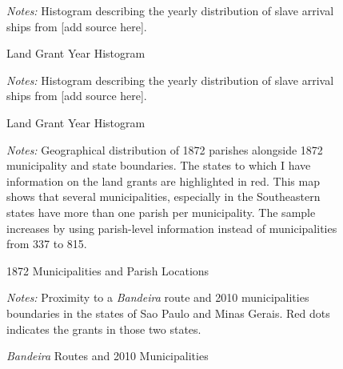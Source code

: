 \documentclass{article}
\begin{document}
\clearpage

\begin{figure}[h!]
  \caption{Land Grant Year Histogram}
  \begin{center}
  \end{center}
  \textit{Notes:} Histogram describing the yearly distribution of slave arrival ships from [add source here].  
  \label{fig:slave_distribution}
\end{figure}

\clearpage

\begin{figure}[h!]
  \caption{Land Grant Year Histogram}
  \begin{center}
  \end{center}
  \textit{Notes:} Histogram describing the yearly distribution of slave arrival ships from [add source here].  
  \label{fig:slave_distribution_region}
\end{figure}


\clearpage

\begin{figure}[h!]
  \caption{1872 Municipalities and Parish Locations}
  \begin{center}
  \end{center}
  \textit{Notes:} Geographical distribution of 1872 parishes alongside 1872 municipality and state boundaries. The states to which I have information on the land grants are highlighted in red. This map shows that several municipalities, especially in the Southeastern states have more than one parish per municipality. The sample increases by using parish-level information instead of municipalities from 337 to 815.
  \label{fig:parishes_1872}
\end{figure}

\clearpage

\begin{figure}[h!]
  \caption{\textit{Bandeira} Routes and 2010 Municipalities}
  \begin{center}
  \end{center}
  \textit{Notes:} Proximity to a \textit{Bandeira} route and 2010 municipalities boundaries in the states of Sao Paulo and Minas Gerais. Red dots indicates the grants in those two states.
  \label{fig:bandeiras_SE}
\end{figure}
\end{document}
